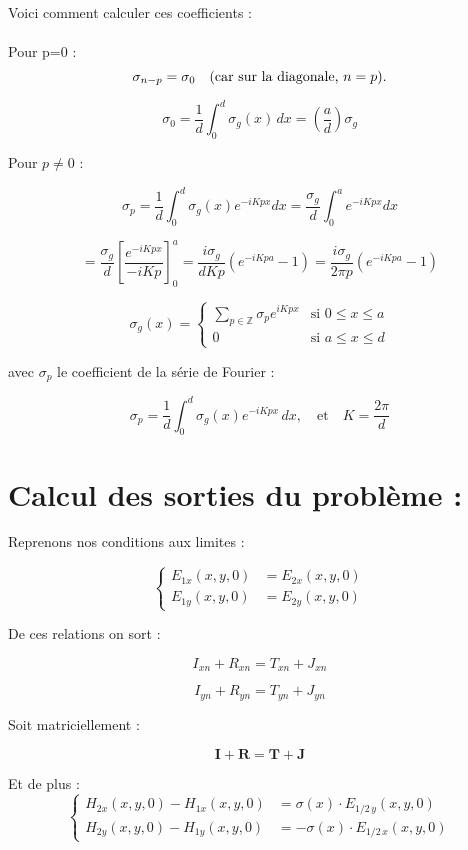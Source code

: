 \documentclass{article}
\begin{document}
Voici comment calculer ces coefficients : \\ \\
Pour p=0 :
\[
\sigma_{n-p} = \sigma_0 \quad \text{(car sur la diagonale, \( n = p \)).}
\]

\[
\sigma_0 = \frac{1}{d} \int_0^d \sigma_g(x)\, dx = \left( \frac{a}{d} \right) \sigma_g
\]

Pour \( p \neq 0 \) :

\[
\sigma_p = \frac{1}{d} \int_0^d \sigma_g(x) e^{-iKp x} dx 
= \frac{\sigma_g}{d} \int_0^a e^{-iKp x} dx
\]

\[
= \frac{\sigma_g}{d} \left[ \frac{e^{-iKp x}}{-iKp} \right]_0^a 
= \frac{i \sigma_g}{d Kp} \left( e^{-iKp a} - 1 \right) 
= \frac{i \sigma_g}{2\pi p} \left( e^{-iKp a} - 1 \right)
\]

\bigskip

\[
\sigma_g(x) = 
\begin{cases}
\sum\limits_{p \in \mathbb{Z}} \sigma_p e^{iKp x} & \text{si } 0 \leq x \leq a \\
0 & \text{si } a \leq x \leq d
\end{cases}
\]

avec \( \sigma_p \) le coefficient de la série de Fourier :

\[
\sigma_p = \frac{1}{d} \int_0^d \sigma_g(x) e^{-iKp x} \, dx,
\quad \text{et} \quad K = \frac{2\pi}{d}
\]

\bigskip

\section*{Calcul des sorties du problème :}

Reprenons nos conditions aux limites : 

\[
\left\{
\begin{aligned}
E_{1x}(x, y, 0) &= E_{2x}(x, y, 0) \\
E_{1y}(x, y, 0) &= E_{2y}(x, y, 0)
\end{aligned}
\right.
\]

De ces relations on sort : 

\[
I_{xn} + R_{xn} = T_{xn} + J_{xn}
\]

\[
I_{yn} + R_{yn} = T_{yn} + J_{yn}
\]

Soit matriciellement : 

\[
\mathbf{I} + \mathbf{R} = \mathbf{T} + \mathbf{J}
\]


Et de plus : 
\[
\left\{
\begin{aligned}
H_{2x}(x, y, 0) - H_{1x}(x, y, 0) &= \sigma(x) \cdot E_{1/2\,y}(x, y, 0) \\
H_{2y}(x, y, 0) - H_{1y}(x, y, 0) &= -\sigma(x) \cdot E_{1/2\,x}(x, y, 0)
\end{aligned}
\right.
\]
\end{document}
